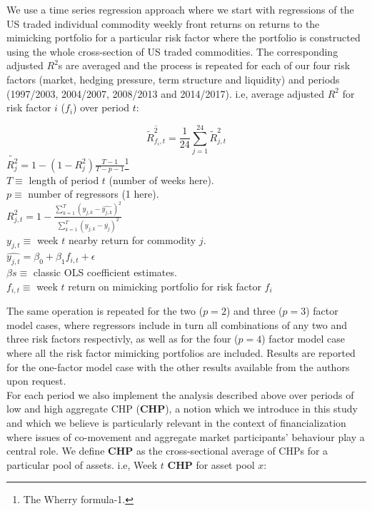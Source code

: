 \documentclass[]{elsarticle} %
\begin{document}
We use a time series regression approach where we start with regressions
of the US traded individual commodity weekly front returns on returns to
the mimicking portfolio for a particular risk factor where the portfolio
is constructed using the whole cross-section of US traded commodities.
The corresponding adjusted \(R^{2}\)s are averaged and the process is
repeated for each of our four risk factors (market, hedging pressure,
term structure and liquidity) and periods (1997/2003, 2004/2007,
2008/2013 and 2014/2017). i.e, average adjusted \(R^{2}\) for risk
factor \(i\) (\(f_{i}\)) over period \(t\):

\[\overline{\tilde{R}_{f_{i},t}^{2}}=\frac{1}{24}\sum_{j=1}^{24}\tilde{R}_{j,t}^{2}\]
\(\tilde{R_{j}^{2}}=1-(1-R_{j}^{2})\frac{T-1}{T-p-1}\)\footnote{The
  Wherry formula-1.}\\
\(T\equiv\) length of period \(t\) (number of weeks here).\\
\(p\equiv\) number of regressors (1 here).\\
\(R_{j,t}^{2}=1-\frac{\sum_{k=1}^{T}(y_{j,k}-\hat{y_{j,k}})^{2}}{\sum_{k=1}^{T}(y_{j,k}-\overline{y_{j}})^{2}}\)\\
\(y_{j,t}\equiv\) week \(t\) nearby return for commodity \(j\).\\
\(\hat{y_{j,t}}=\beta_{0}+\beta_{1}f_{i,t}+\epsilon\)\\
\(\beta s \equiv\) classic OLS coefficient estimates.\\
\(f_{i,t}\equiv\) week \(t\) return on mimicking portfolio for risk
factor \(f_{i}\)

The same operation is repeated for the two (\(p=2\)) and three (\(p=3\))
factor model cases, where regressors include in turn all combinations of
any two and three risk factors respectivly, as well as for the four
(\(p=4\)) factor model case where all the risk factor mimicking
portfolios are included. Results are reported for the one-factor model
case with the other results available from the authors upon request.\\
For each period we also implement the analysis described above over
periods of low and high aggregate CHP (\textbf{CHP}), a notion which we
introduce in this study and which we believe is particularly relevant in
the context of financialization where issues of co-movement and
aggregate market participants' behaviour play a central role. We define
\textbf{CHP} as the cross-sectional average of CHPs for a particular
pool of assets. i.e, Week \(t\) \textbf{CHP} for asset pool \(x\):
\end{document}
